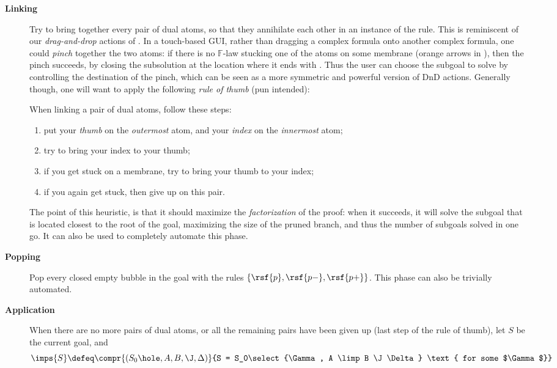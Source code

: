 \begin{description}
  \item[\textbf{Linking}] Try to bring together every pair of dual atoms, so
    that they annihilate each other in an instance of the 
    rule. This is reminiscent of our \emph{drag-and-drop} actions of
    . In a touch-based GUI, rather than dragging a complex formula
    onto another complex formula, one could \emph{pinch} together the two atoms:
    if there is no $\mathbb{F}$-law stucking one of the atoms on some membrane
    (orange arrows in ), then the pinch succeeds, by
    closing the subsolution at the location where it ends with
    . Thus the user can choose the subgoal to solve by
    controlling the destination of the pinch, which can be seen as a more
    symmetric and powerful version of DnD actions. Generally though, one will
    want to apply the following \emph{rule of thumb} (pun intended):
    \begin{fact}
      When linking a pair of dual atoms, follow these steps:
      \begin{enumerate}
        \item put your \emph{thumb} on the \emph{outermost} atom, and your
              \emph{index} on the \emph{innermost} atom;
        \item try to bring your index to your thumb;
        \item if you get stuck on a membrane, try to bring your thumb to your
              index;
        \item if you again get stuck, then give up on this pair.
      \end{enumerate}
    \end{fact}
    The point of this heuristic, is that it should maximize the
    \emph{factorization} of the proof: when it succeeds, it will solve the
    subgoal that is located closest to the root of the goal, maximizing the size
    of the pruned branch, and thus the number of subgoals solved in one go. It
    can also be used to completely automate this phase.

  \item[\textbf{Popping}] Pop every closed empty bubble in the goal with the
  rules $\{\rsf{p},\rsf{p{-}},\rsf{p{+}}\}$. This phase can also be trivially
  automated.

  \item[\textbf{Application}] When there are no more pairs of dual atoms, or all
    the remaining pairs have been given up (last step of the rule of thumb), let
    $S$ be the current goal, and
    $$\imps{S} \defeq \compr{(S_0\hole, A, B, \J, \Delta)}{S = S_0\select{\Gamma,
          A \limp B \J \Delta} \text{ for some $\Gamma$}}$$


\end{description}
